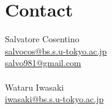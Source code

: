 \documentclass[12pt]{article} %
\begin{document}
\section{Contact}
Salvatore Cosentino\\
\href{mailto:salvocos@bs.s.u-tokyo.ac.jp}{salvocos@bs.s.u-tokyo.ac.jp}\\
\href{mailto:salvo981@gmail.com}{salvo981@gmail.com}\\\\
Wataru Iwasaki\\
\href{mailto:iwasaki@bs.s.u-tokyo.ac.jp}{iwasaki@bs.s.u-tokyo.ac.jp}\\


%
%

\end{document}
